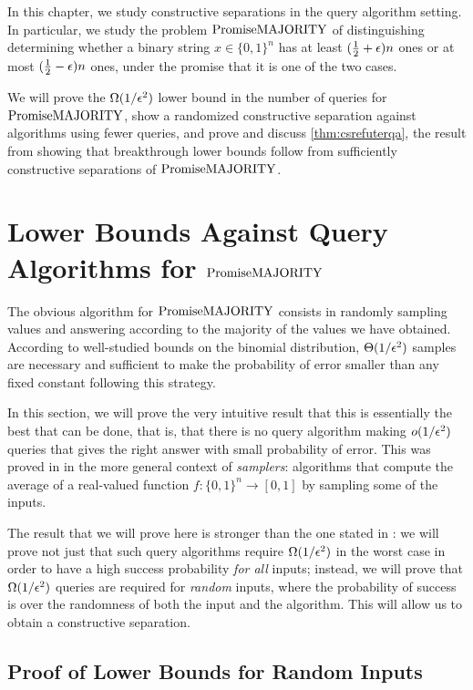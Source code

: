 In this chapter, we study constructive separations in the query algorithm setting.
In particular, we study the problem $\mathrm{PromiseMAJORITY}$ of distinguishing determining whether
a binary string $x \in \{0, 1\}^n$ has at least $(\frac{1}{2}+\epsilon)n$ ones or
at most $(\frac{1}{2}-\epsilon)n$ ones, under the promise that it is one of the two
cases. 

We will prove the $\Omega(1/\epsilon^2)$ lower bound in the number of queries
for $\mathrm{PromiseMAJORITY}$, show a randomized constructive separation against algorithms
using fewer queries, and prove and discuss \cref{thm:csrefuterqa}, the result
from \cite{ConstructiveSeparations} showing that breakthrough lower
bounds follow from sufficiently constructive separations of $\mathrm{PromiseMAJORITY}$.  


\section{Lower Bounds Against Query Algorithms for $\mathrm{PromiseMAJORITY}$}
\label{sec:lbqa}

The obvious algorithm for $\mathrm{PromiseMAJORITY}$ consists in randomly sampling values and answering 
according to the majority of the values we have obtained. According to well-studied
bounds on the binomial distribution, $\Theta(1/\epsilon^2)$ samples
are necessary and sufficient to make the probability of error smaller than any 
fixed constant following this strategy.

In this section, we will prove the very intuitive result that this is essentially
the best that can be done, that is, that there is no query algorithm making $o(1/\epsilon^2)$
queries that gives the right answer with small probability of error. This was 
proved in \cite{Canetti95} in the more general context of \emph{samplers}: algorithms
that compute the average of a real-valued function $f \colon \{0, 1\}^n \to [0, 1]$
by sampling some of the inputs. 

The result that we will prove here is stronger than the one stated in \cite{Canetti95}:
we will prove not just that such query algorithms require $\Omega(1/\epsilon^2)$ in the 
worst case in order to have a high success probability \emph{for all} inputs; instead,
we will prove that $\Omega(1/\epsilon^2)$ queries are required for \emph{random} inputs,
where the probability of success is over the randomness of both the input and the algorithm.
This will allow us to obtain a constructive separation.

\subsection{Proof of Lower Bounds for Random Inputs}



